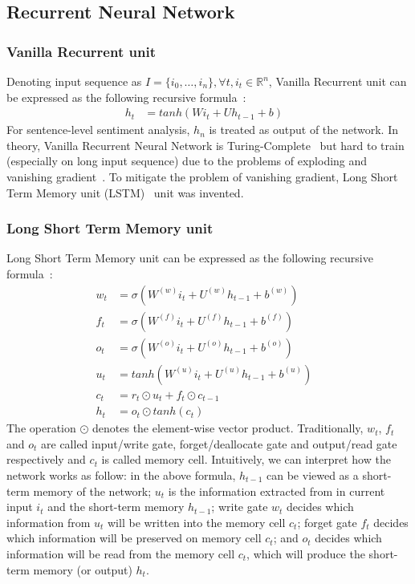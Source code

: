 \subsection{Recurrent Neural Network}
\subsubsection{Vanilla Recurrent unit}\label{sec:vanilla-rnn}
Denoting input sequence as \(I = \{i_0,\ldots,i_n\}, \forall t, i_t \in \mathbb{R}^n\), Vanilla Recurrent unit can be expressed as the following recursive formula~\cite{treeLSTM}:
\begin{align}
h_t &= tanh(Wi_t + Uh_{t-1} + b)&
\end{align}
For sentence-level sentiment analysis, \(h_n\) is treated as output of the network.
In theory, Vanilla Recurrent Neural Network is Turing-Complete~\cite{rnn-turing-complete} but hard to train (especially on long input sequence) due to the problems of exploding and vanishing gradient~\cite{Bengio1994}.
To mitigate the problem of vanishing gradient, Long Short Term Memory unit (LSTM)~\cite{originLSTM} unit was invented.
\subsubsection{Long Short Term Memory unit}\label{sec:lstm}
Long Short Term Memory unit can be expressed as the following recursive formula~\cite{treeLSTM}:
\begin{align}
w_t &= \sigma\left(W^{(w)}i_t + U^{(w)}h_{t-1} + b^{(w)}\right) \label{eq:lstm-input-gate}&\\
f_t &= \sigma\left(W^{(f)}i_t + U^{(f)}h_{t-1} + b^{(f)}\right) \label{eq:lstm-forget-gate}&\\
o_t &= \sigma\left(W^{(o)}i_t + U^{(o)}h_{t-1} + b^{(o)}\right) \label{eq:lstm-output-gate}&\\
u_t &= tanh\left(W^{(u)}i_t + U^{(u)}h_{t-1} + b^{(u)}\right) \label{eq:lstm-update-gate}&\\
c_t &= r_t \odot u_t + f_t \odot c_{t-1} \label{eq:longterm-mem}&\\
h_t &= o_t \odot tanh(c_t) \label{eq:temperal-mem}&
\end{align}
The operation \(\odot\) denotes the element-wise vector product.
Traditionally, \(w_t\), \(f_t\) and \(o_t\) are called input/write gate, forget/deallocate gate and output/read gate respectively and \(c_t\) is called memory cell.
Intuitively, we can interpret how the network works as follow:
in the above formula, \(h_{t-1}\) can be viewed as a short-term memory of the network;
\(u_t\) is the information extracted from in current input \(i_t\) and the short-term memory \(h_{t-1}\);
write gate \(w_t\) decides which information from \(u_t\) will be written into the memory cell \(c_t\);
forget gate \(f_t\) decides which information will be preserved on memory cell \(c_t\);
and \(o_t\) decides which information will be read from the memory cell \(c_t\), which will produce the short-term memory (or output) \(h_t\).
